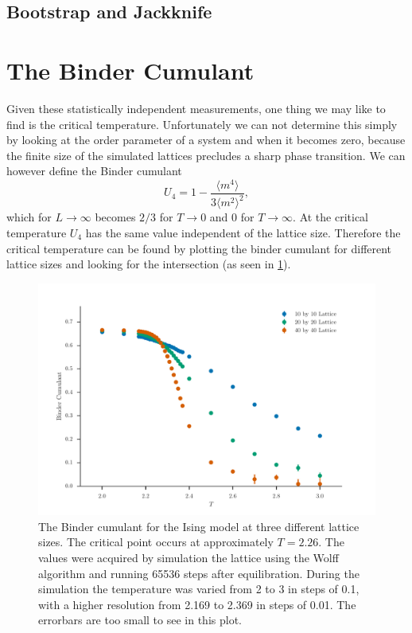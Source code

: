 \documentclass[11pt, a4paper]{report} %
\begin{document}
\subsection{Bootstrap and Jackknife}
\section{The Binder Cumulant}
Given these statistically independent measurements, one thing we may like to find is the critical temperature.
Unfortunately we can not determine this simply by looking at the order parameter of a system and when it becomes zero, because the finite size of the simulated lattices precludes a sharp phase transition.
We can however define the Binder cumulant\cite{binder:1981b}
\begin{equation}
	U_4 = 1 - \frac{\langle m^4 \rangle}{3 \langle m^2 \rangle^2},
\end{equation}
which for \(L \to \infty\) becomes \(2/3\) for \(T \to 0\) and 0 for \(T \to \infty\).\cite{landau:2015}
At the critical temperature \(U_4\) has the same value independent of the lattice size.
Therefore the critical temperature can be found by plotting the binder cumulant for different lattice sizes and looking for the intersection (as seen in \cref{fig:ising_binder_cumulant}).
\begin{figure}[h]
	\includegraphics[width=\textwidth]{wolff_binder_cumulant.pdf}
	\caption{The Binder cumulant for the Ising model at three different lattice sizes. The critical point occurs at approximately \(T = 2.26\). The values were acquired by simulation the lattice using the Wolff algorithm and running 65536 steps after equilibration. During the simulation the temperature was varied from 2 to 3 in steps of 0.1, with a higher resolution from 2.169 to 2.369 in steps of 0.01. The errorbars are too small to see in this plot.}
	\label{fig:ising_binder_cumulant}
\end{figure}
\end{document}
